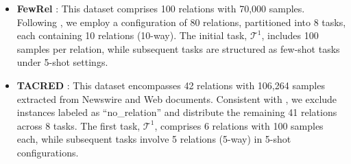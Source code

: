 \begin{itemize}
    \item \textbf{FewRel} \citep{han-etal-2018-fewrel}: This dataset comprises 100 relations with 70,000 samples. Following \citet{DBLP:conf/acl/QinJ22}, we employ a configuration of 80 relations, partitioned into 8 tasks, each containing 10 relations (10-way). The initial task, $\mathcal{T}^1$, includes 100 samples per relation, while subsequent tasks are structured as few-shot tasks under 5-shot settings.
\begin{table}[h]
    \centering
    \caption{Fewrel Dataset with UR Statistics}
    \label{tab:first1}
\end{table}

    \item \textbf{TACRED} \citep{zhang-etal-2017-position}: This dataset encompasses 42 relations with 106,264 samples extracted from Newswire and Web documents. Consistent with \citep{DBLP:conf/acl/QinJ22}, we exclude instances labeled as ``no\_relation'' and distribute the remaining 41 relations across 8 tasks. The first task, $\mathcal{T}^1$, comprises 6 relations with 100 samples each, while subsequent tasks involve 5 relations (5-way) in 5-shot configurations.
\begin{table}[h]
    \centering
    \caption{Tacred Dataset with UR Statistics}
    \label{tab:second2}
\end{table}
    
\end{itemize}

